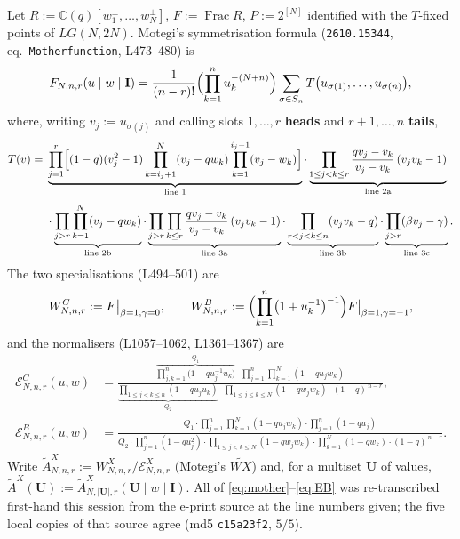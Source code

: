 \documentclass[11pt]{article}
\theoremstyle{definition}
\newcommand{\At}{\widetilde{A}}
\newcommand{\bI}{\mathbf{I}}
\newcommand{\bU}{\mathbf{U}}
\newcommand{\EB}{\mathcal{E}^{B}}
\newcommand{\EC}{\mathcal{E}^{C}}
\newcommand{\EX}{\mathcal{E}^{X}}
\begin{document}
Let $R:=\mathbb{C}(q)[w_1^{\pm},\dots,w_N^{\pm}]$, $F:=\operatorname{Frac}R$,
$P:=2^{[N]}$ identified with the $T$-fixed points of $LG(N,2N)$.  Motegi's
symmetrisation formula (\texttt{2610.15344}, eq.\ \texttt{Motherfunction},
L473--480) is
\begin{equation}\label{eq:mother}
   F_{N,n,r}(u\mid w\mid\bI)
   =\frac{1}{(n-r)!}\Bigl(\prod_{k=1}^{n}u_k^{-(N+n)}\Bigr)
     \sum_{\sigma\in S_n}T\bigl(u_{\sigma(1)},\dots,u_{\sigma(n)}\bigr),
\end{equation}
where, writing $v_j:=u_{\sigma(j)}$ and calling slots $1,\dots,r$ \textbf{heads}
and $r+1,\dots,n$ \textbf{tails},
\begin{equation}\label{eq:T}
\begin{aligned}
T(v)=\;&\underbrace{\prod_{j=1}^{r}\Bigl[(1-q)(v_j^2-1)
   \prod_{k=i_j+1}^{N}(v_j-qw_k)\prod_{k=1}^{i_j-1}(v_j-w_k)\Bigr]}_{\text{line 1}}
   \cdot\underbrace{\prod_{1\le j<k\le r}\frac{qv_j-v_k}{v_j-v_k}\,(v_jv_k-1)}_{\text{line 2a}}\\[1mm]
   &\cdot\underbrace{\prod_{j>r}\prod_{k=1}^{N}(v_j-qw_k)}_{\text{line 2b}}
   \cdot\underbrace{\prod_{j>r}\prod_{k\le r}\frac{qv_j-v_k}{v_j-v_k}\,(v_jv_k-1)}_{\text{line 3a}}
   \cdot\underbrace{\prod_{r<j<k\le n}(v_jv_k-q)}_{\text{line 3b}}
   \cdot\underbrace{\prod_{j>r}(\beta v_j-\gamma)}_{\text{line 3c}} .
\end{aligned}
\end{equation}
The two specialisations (L494--501) are
\begin{equation}\label{eq:WBWC}
  W^{C}_{N,n,r}:=F\big|_{\beta=1,\gamma=0},
  \qquad
  W^{B}_{N,n,r}:=\Bigl(\prod_{k=1}^{n}\bigl(1+u_k^{-1}\bigr)^{-1}\Bigr)
                 F\big|_{\beta=1,\gamma=-1},
\end{equation}
and the normalisers (L1057--1062, L1361--1367) are
\begin{align}
  \EC_{N,n,r}(u,w)&=
  \frac{\overbrace{\textstyle\prod_{j,k=1}^{n}\bigl(1-q u_j^{-1}u_k\bigr)}^{\textstyle Q_1}
        \cdot\prod_{j=1}^{n}\prod_{k=1}^{N}(1-qu_jw_k)}
       {\underbrace{\textstyle\prod_{1\le j<k\le n}(1-qu_ju_k)}_{\textstyle Q_2}
        \cdot\prod_{1\le j\le k\le N}(1-qw_jw_k)\cdot(1-q)^{\,n-r}},
  \label{eq:EC}\\[2mm]
  \EB_{N,n,r}(u,w)&=
  \frac{Q_1\cdot\prod_{j=1}^{n}\prod_{k=1}^{N}(1-qu_jw_k)
        \cdot\boxed{\textstyle\prod_{j=1}^{n}(1-qu_j)}}
       {Q_2\cdot\boxed{\textstyle\prod_{j=1}^{n}(1-qu_j^{2})}
        \cdot\prod_{1\le j<k\le N}(1-qw_jw_k)\cdot\prod_{k=1}^{N}(1-qw_k)
        \cdot(1-q)^{\,n-r}} .
  \label{eq:EB}
\end{align}
Write $\At^{X}_{N,n,r}:=W^{X}_{N,n,r}/\EX_{N,n,r}$ (Motegi's
$\widetilde{WX}$) and, for a multiset $\bU$ of values,
$\At^{X}(\bU):=\At^{X}_{N,|\bU|,r}(\bU\mid w\mid\bI)$.  All of
\eqref{eq:mother}--\eqref{eq:EB} was re-transcribed first-hand this session from
the e-print source at the line numbers given; the five local copies of that
source agree (md5 \texttt{c15a23f2}, $5/5$).
\end{document}
